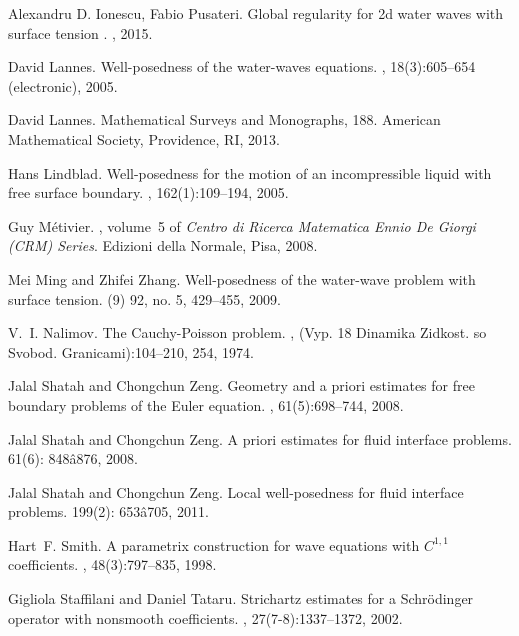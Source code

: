 \documentclass[11pt,english]{smfart}
\theoremstyle{plain}
\theoremstyle{definition}
\numberwithin{equation}{section}
\begin{document}
\begin{thebibliography}{10}
Alexandru D. Ionescu, Fabio Pusateri.
\newblock Global regularity for 2d water waves with surface tension .
,  2015.

David Lannes.
\newblock Well-posedness of the water-waves equations.
, 18(3):605--654 (electronic), 2005.

David Lannes.
\newblock Mathematical Surveys and Monographs, 188. American Mathematical Society, Providence, RI, 2013. 

Hans Lindblad.
\newblock Well-posedness for the motion of an incompressible liquid with free
  surface boundary.
, 162(1):109--194, 2005.

Guy M{\'e}tivier.
, volume~5 of {\em Centro di Ricerca Matematica
  Ennio De Giorgi (CRM) Series}.
\newblock Edizioni della Normale, Pisa, 2008.

Mei Ming and Zhifei Zhang.
\newblock Well-posedness of the water-wave problem with surface tension.
 (9) 92, no. 5, 429--455, 2009. 

V.~I. Nalimov.
\newblock The {C}auchy-{P}oisson problem.
, (Vyp. 18 Dinamika Zidkost. so 
Svobod. Granicami):104--210, 254, 1974.

Jalal Shatah and Chongchun Zeng.
\newblock Geometry and a priori estimates for free boundary problems of the
  {E}uler equation.
, 61(5):698--744, 2008.

Jalal Shatah and Chongchun Zeng.
\newblock  A priori estimates for fluid interface problems.
 61(6): 848â876, 2008.

Jalal Shatah and Chongchun Zeng.
 \newblock Local well-posedness for fluid interface problems. 
 199(2): 653â705, 2011.

Hart~F. Smith.
\newblock A parametrix construction for wave equations with {$C^{1,1}$}
  coefficients.
, 48(3):797--835, 1998.

Gigliola Staffilani and Daniel Tataru.
\newblock Strichartz estimates for a {S}chr\"odinger operator with nonsmooth
  coefficients.
, 27(7-8):1337--1372, 2002.


\end{thebibliography}
\end{document}
